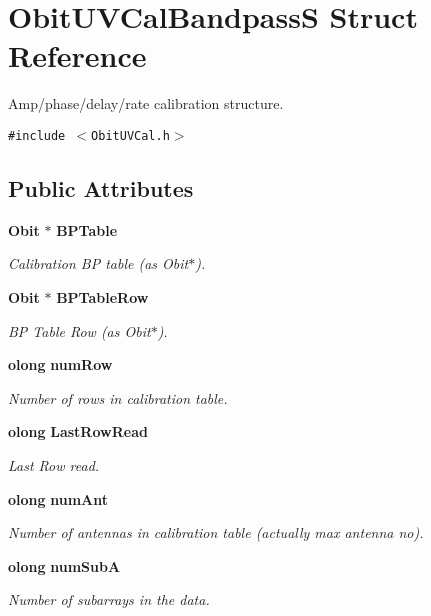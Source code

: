 \section{Obit\-UVCal\-Bandpass\-S Struct Reference}
\label{structObitUVCalBandpassS}
Amp/phase/delay/rate calibration structure.  


{\tt \#include $<$Obit\-UVCal.h$>$}

\subsection*{Public Attributes}
\begin{CompactItemize}
\item 
{\bf Obit} $\ast$ {\bf BPTable}
\begin{CompactList}\small\item\em Calibration BP table (as Obit$\ast$). \item\end{CompactList}\item 
{\bf Obit} $\ast$ {\bf BPTable\-Row}
\begin{CompactList}\small\item\em BP Table Row (as Obit$\ast$). \item\end{CompactList}\item 
{\bf olong} {\bf num\-Row}
\begin{CompactList}\small\item\em Number of rows in calibration table. \item\end{CompactList}\item 
{\bf olong} {\bf Last\-Row\-Read}
\begin{CompactList}\small\item\em Last Row read. \item\end{CompactList}\item 
{\bf olong} {\bf num\-Ant}
\begin{CompactList}\small\item\em Number of antennas in calibration table (actually max antenna no). \item\end{CompactList}\item 
{\bf olong} {\bf num\-Sub\-A}
\begin{CompactList}\small\item\em Number of subarrays in the data. \item\end{CompactList}\item 

\end{CompactItemize}
